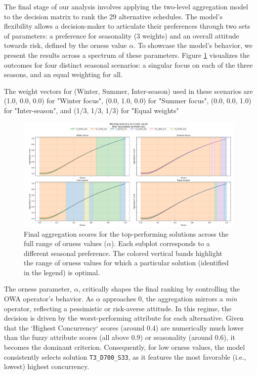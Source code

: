 \label{sec:results}

The final stage of our analysis involves applying the two-level aggregation model to the decision matrix to rank the 29 alternative schedules. The model's flexibility allows a decision-maker to articulate their preferences through two sets of parameters: a preference for seasonality (3 weights) and an overall attitude towards risk, defined by the orness value $\alpha$. To showcase the model's behavior, we present the results across a spectrum of these parameters. Figure \ref{fig:results_plot} visualizes the outcomes for four distinct seasonal scenarios: a singular focus on each of the three seasons, and an equal weighting for all. 

The weight vectors for (Winter, Summer, Inter-season) used in these scenarios are (1.0, 0.0, 0.0) for "Winter focus", (0.0, 1.0, 0.0) for "Summer focus", (0.0, 0.0, 1.0) for "Inter-season", and (1/3, 1/3, 1/3) for "Equal weights"

\begin{figure}[h!]
    \centering
    \begin{adjustwidth}{-1.2cm}{-1.8cm}
    \includegraphics[width=1.08\textwidth]{ch3/figures/ResultsOrness.png}
    \end{adjustwidth}
    \caption{Final aggregation scores for the top-performing solutions across the full range of orness values ($\alpha$). Each subplot corresponds to a different seasonal preference. The colored vertical bands highlight the range of orness values for which a particular solution (identified in the legend) is optimal.}
    \label{fig:results_plot}
\end{figure}

The orness parameter, $\alpha$, critically shapes the final ranking by controlling the OWA operator's behavior. As $\alpha$ approaches 0, the aggregation mirrors a \textit{min} operator, reflecting a pessimistic or risk-averse attitude. In this regime, the decision is driven by the worst-performing attribute for each alternative. Given that the `Highest Concurrency` scores (around 0.4) are numerically much lower than the fuzzy attribute scores (all above 0.9) or seasonality (around 0.6), it becomes the dominant criterion. Consequently, for low orness values, the model consistently selects solution \texttt{T3\_D700\_S33}, as it features the most favorable (i.e., lowest) highest concurrency.\\

